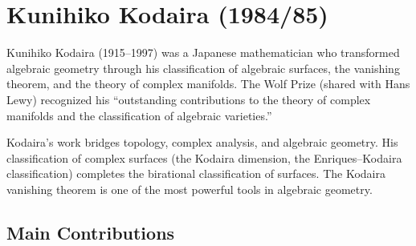 \let\im\relax
\newcommand{\im}{\operatorname{im}}
\let\End\relax
\newcommand{\End}{\operatorname{End}}
\let\Ker\relax
\newcommand{\Ker}{\operatorname{Ker}}
\let\Aut\relax
\newcommand{\Aut}{\operatorname{Aut}}
\let\Hom\relax
\newcommand{\Hom}{\operatorname{Hom}}
\let\Pic\relax
\newcommand{\Pic}{\operatorname{Pic}}
\let\Alb\relax
\newcommand{\Alb}{\operatorname{Alb}}
\let\Jac\relax
\newcommand{\Jac}{\operatorname{Jac}}
\let\Div\relax
\newcommand{\Div}{\operatorname{Div}}
\let\codim\relax
\newcommand{\codim}{\operatorname{codim}}
\let\ch\relax
\newcommand{\ch}{\operatorname{ch}}
\let\Proj\relax
\newcommand{\Proj}{\operatorname{Proj}}
\let\Spec\relax
\newcommand{\Spec}{\operatorname{Spec}}
\let\sing\relax
\newcommand{\sing}{\operatorname{sing}}
\let\N\relax
\newcommand{\N}{\mathbb{N}}
\let\R\relax
\newcommand{\R}{\mathbb{R}}
\let\C\relax
\newcommand{\C}{\mathbb{C}}
\let\Q\relax
\newcommand{\Q}{\mathbb{Q}}
\let\Z\relax
\newcommand{\Z}{\mathbb{Z}}

\chapter{Kunihiko Kodaira (1984/85)}

Kunihiko Kodaira (1915--1997) was a Japanese mathematician who transformed algebraic geometry through his classification of algebraic surfaces, the vanishing theorem, and the theory of complex manifolds. The Wolf Prize (shared with Hans Lewy) recognized his ``outstanding contributions to the theory of complex manifolds and the classification of algebraic varieties.''

Kodaira's work bridges topology, complex analysis, and algebraic geometry. His classification of complex surfaces (the Kodaira dimension, the Enriques--Kodaira classification) completes the birational classification of surfaces. The Kodaira vanishing theorem is one of the most powerful tools in algebraic geometry.

\section{Main Contributions}

